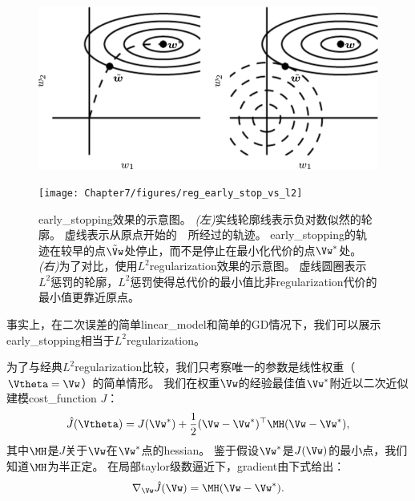 \begin{figure}[!htb]
\ifOpenSource
\centerline{\includegraphics[scale=0.5]{images/57.png}}
\else
\centerline{\texttt{[image: Chapter7/figures/reg\_early\_stop\_vs\_l2]}}
\fi
\caption{\gls{early_stopping}效果的示意图。
\emph{(左)}实线轮廓线表示负对数似然的轮廓。
虚线表示从原点开始的~~所经过的轨迹。 %
\gls{early_stopping}的轨迹在较早的点$\tilde \Vw$处停止，而不是停止在最小化代价的点$\Vw^*$处。
\emph{(右)}为了对比，使用$L^2$\gls{regularization}效果的示意图。
虚线圆圈表示$L^2$惩罚的轮廓，$L^2$惩罚使得总代价的最小值比非\gls{regularization}代价的最小值更靠近原点。
}
\label{fig:chap7_reg_l1_vs_l2_mistake}
\end{figure}

事实上，在二次误差的简单\gls{linear_model}和简单的\gls{GD}情况下，我们可以展示\gls{early_stopping}相当于$L^2$\gls{regularization}。

为了与经典$L^2$\gls{regularization}比较，我们只考察唯一的参数是线性权重（$\Vtheta = \Vw$）的简单情形。
我们在权重$\Vw$的经验最佳值$\Vw^*$附近以二次近似建模\gls{cost_function} $J$：
\begin{align}
 \hat J(\Vtheta) = J(\Vw^*) + \frac{1}{2}  (\Vw- \Vw^*)^\top \MH  (\Vw - \Vw^*),
\end{align}
其中$\MH$是$J$关于$\Vw$在$\Vw^*$点的\gls{hessian}。
鉴于假设$\Vw^*$是$J(\Vw)$的最小点，我们知道$\MH$为半正定。
在局部\gls{taylor}级数逼近下，\gls{gradient}由下式给出：
\begin{align}
 \nabla_{\Vw} \hat J (\Vw) = \MH (\Vw - \Vw^*).
\end{align}


